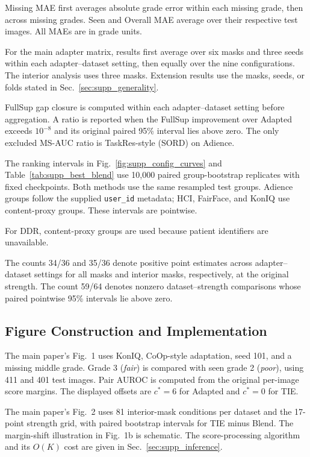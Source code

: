 Missing MAE first averages absolute grade error within each missing grade, then across missing grades.
Seen and Overall MAE average over their respective test images.
All MAEs are in grade units.

For the main adapter matrix, results first average over six masks and three seeds within each adapter--dataset setting, then equally over the nine configurations.
The interior analysis uses three masks.
Extension results use the masks, seeds, or folds stated in Sec.~\ref{sec:supp_generality}.

FullSup gap closure is computed within each adapter--dataset setting before aggregation.
A ratio is reported when the FullSup improvement over Adapted exceeds $10^{-8}$ and its original paired 95\% interval lies above zero.
The only excluded MS-AUC ratio is TaskRes-style (SORD) on Adience.

The ranking intervals in Fig.~\ref{fig:supp_config_curves} and Table~\ref{tab:supp_best_blend} use 10{,}000 paired group-bootstrap replicates with fixed checkpoints.
Both methods use the same resampled test groups.
Adience groups follow the supplied \texttt{user\_id} metadata; HCI, FairFace, and KonIQ use content-proxy groups.
These intervals are pointwise.

For DDR, content-proxy groups are used because patient identifiers are unavailable.

The counts 34/36 and 35/36 denote positive point estimates across adapter--dataset settings for all masks and interior masks, respectively, at the original strength.
The count 59/64 denotes nonzero dataset--strength comparisons whose paired pointwise 95\% intervals lie above zero.

\subsection{Figure Construction and Implementation}
\label{sec:supp_f_figures}

The main paper's Fig.~1 uses KonIQ, CoOp-style adaptation, seed 101, and a missing middle grade.
Grade 3 (\emph{fair}) is compared with seen grade 2 (\emph{poor}), using 411 and 401 test images.
Pair AUROC is computed from the original per-image score margins.
The displayed offsets are $c^*=6$ for Adapted and $c^*=0$ for TIE.

The main paper's Fig.~2 uses 81 interior-mask conditions per dataset and the 17-point strength grid, with paired bootstrap intervals for TIE minus Blend.
The margin-shift illustration in Fig.~1b is schematic.
The score-processing algorithm and its $O(K)$ cost are given in Sec.~\ref{sec:supp_inference}.
